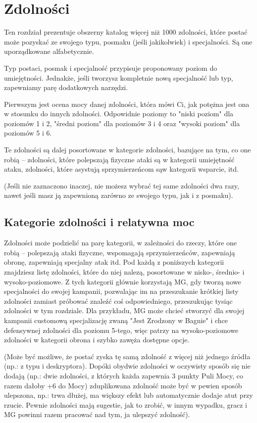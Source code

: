 \section{Zdolności}

Ten rozdział prezentuje obszerny katalog więcej niż 1000 zdolności, które postać może pozyskać ze swojego typu, posmaku (jeśli jakikolwiek) i specjalności. Są one uporządkowane alfabetycznie.

Typ postaci, posmak i specjalność przypisuje proponowany poziom do umiejętności. Jednakże, jeśli tworzysz kompletnie nową specjalność lub typ, zapewniamy parę dodatkowych narzędzi. 

Pierwszym jest ocena mocy danej zdolności, która mówi Ci, jak potężna jest ona w stosunku do innych zdolności. Odpowidnie poziomy to "niski poziom" dla poziomów 1 i 2, "średni poziom" dla poziomów 3 i 4 oraz "wysoki poziom" dla poziomów 5 i 6.

Te zdolności są dalej posortowane w kategorie zdolności, bazujące na tym, co one robią – zdolności, które polepszają fizyczne ataki są w kategorii umiejętność ataku, zdolności, które asystują sprzymierzeńcom sąw kategorii wsparcie, itd.

(Jeśli nie zaznaczono inaczej, nie możesz wybrać tej same zdolności dwa razy, nawet jeśli masz ją zapewnioną zarówno ze swojego typu, jak i z posmaku).

\subsection{Kategorie zdolności i relatywna moc}

Zdolności może podzielić na parę kategorii, w zależności do rzeczy, które one robią – polepszają ataki fizyczne, wspomagają sprzymierzeńców, zapewniają obronę, zapewniają specjalny atak itd. Pod każdą z poniższych kategorii znajdziesz listę zdolności, które do niej nalezą, posortowane w nisko-, średnio- i wysoko-poziomowe. Z tych kategorii głównie korzystają MG, gdy tworzą nowe specjalności do swojej kampanii, pozwalając im na przeszukanie krótkiej listy zdolności zamiast próbować znaleźć coś odpowiedniego, przeszukując tysiąc zdolności w tym rozdziale. Dla przykładu, MG może chcieć stworzyć dla swojej kampanii customową specjalizację zwaną "Jest Zrodzony w Bagnie" i chce defensywnej zdolności dla poziomu 5-tego, więc patrzy na wysoko-poziomowe zdolności w kategorii obrona i szybko zawęża dostępne opcje.

(Może być możliwe, że postać zyska tę samą zdolność z więcej niż jednego źródła (np.: z typu i deskryptora). Dopóki obydwie zdolności w oczywisty sposób się nie dodają (np.: dwie zdolności, z których każda zapewnia 3 punkty Puli Mocy, co razem dałoby +6 do Mocy) zduplikowana zdolność może być w pewien sposób ulepszona, np.: trwa dłużej, ma większy efekt lub automatycznie dodaje atut przy rzucie. Pewnie zdolności mają sugestie, jak to zrobić, w innym wypadku, gracz i MG powinni razem pracować nad tym, ja ulepszyć zdolność).

